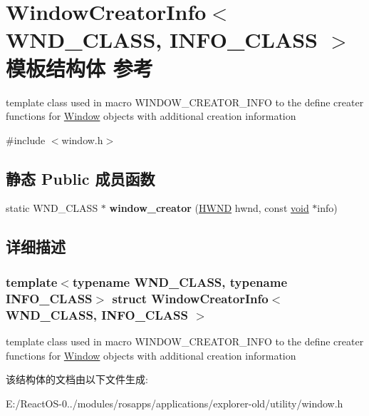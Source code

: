 \hypertarget{struct_window_creator_info}{}\section{Window\+Creator\+Info$<$ W\+N\+D\+\_\+\+C\+L\+A\+SS, I\+N\+F\+O\+\_\+\+C\+L\+A\+SS $>$ 模板结构体 参考}
\label{struct_window_creator_info}


template class used in macro W\+I\+N\+D\+O\+W\+\_\+\+C\+R\+E\+A\+T\+O\+R\+\_\+\+I\+N\+FO to the define creater functions for \hyperlink{struct_window}{Window} objects with additional creation information  




{\ttfamily \#include $<$window.\+h$>$}

\subsection*{静态 Public 成员函数}
\begin{DoxyCompactItemize}
\item 
\mbox{\label{struct_window_creator_info_a35a0f2b495baf031490c004f381c6b4a}} 
static W\+N\+D\+\_\+\+C\+L\+A\+SS $\ast$ {\bfseries window\+\_\+creator} (\hyperlink{interfacevoid}{H\+W\+ND} hwnd, const \hyperlink{interfacevoid}{void} $\ast$info)
\end{DoxyCompactItemize}


\subsection{详细描述}
\subsubsection*{template$<$typename W\+N\+D\+\_\+\+C\+L\+A\+SS, typename I\+N\+F\+O\+\_\+\+C\+L\+A\+SS$>$\newline
struct Window\+Creator\+Info$<$ W\+N\+D\+\_\+\+C\+L\+A\+S\+S, I\+N\+F\+O\+\_\+\+C\+L\+A\+S\+S $>$}

template class used in macro W\+I\+N\+D\+O\+W\+\_\+\+C\+R\+E\+A\+T\+O\+R\+\_\+\+I\+N\+FO to the define creater functions for \hyperlink{struct_window}{Window} objects with additional creation information 

该结构体的文档由以下文件生成\+:\begin{DoxyCompactItemize}
\item 
E\+:/\+React\+O\+S-\/0../modules/rosapps/applications/explorer-\/old/utility/window.\+h\end{DoxyCompactItemize}
